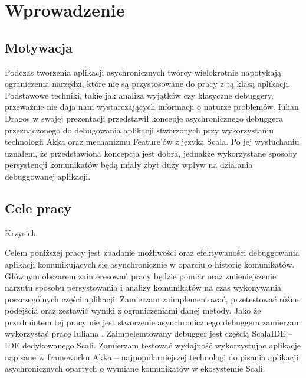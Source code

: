 \chapter{Wprowadzenie}


\section{Motywacja}

Podczas tworzenia aplikacji asychronicznych twórcy wielokrotnie napotykają ograniczenia narzędzi, które nie są przystosowane do pracy z tą klasą aplikacji. Podstawowe techniki, takie jak analiza wyjątków czy klasyczne debuggery, przeważnie nie daja nam wystarczających informacji o naturze problemów. Iulian Dragos w swojej prezentacji  \cite{rethingningDebugger} przedstawił koncepje asychronicznego debuggera przeznaczonego do debugowania aplikacji stworzonych przy wykorzystaniu technologii Akka oraz mechanizmu Feature'ów z języka Scala. Po jej wysłuchaniu uznałem, że przedstawiona koncepcja jest dobra, jednakże wykorzystane sposoby persystencji komunikatów będą miały zbyt duży wpływ na działania debuggowanej aplikacji.



\section{Cele pracy}

Krzysiek

Celem poniższej pracy jest zbadanie możliwości oraz efektywaności debuggowania aplikacji komunikujących się asynchronicznie w oparciu o historię komunikatów. Głównym obszarem zainteresowań pracy będzie pomiar oraz zmieniejszenie narzutu sposobu persystowania i analizy komunikatów na czas wykonywania poszczególnych części aplikacji. Zamierzam zaimplementować, przetestować różne podejścia oraz zestawić wyniki z ograniczeniami danej metody. Jako że przedmiotem tej pracy nie jest stworzenie asynchronicznego debuggera zamierzam wykorzystać pracę Iuliana \cite{asychDebuggerGh}. Zaimpelemtowany debugger jest częścią ScalaIDE – IDE dedykowanego Scali. Zamierzam testować wydajność wykorzystując aplikacje napisane w frameworku Akka – najpopularniejszej technologi do pisania aplikacji asychronicznych opartych o wymiane komunikatów w ekosystemie Scali.













